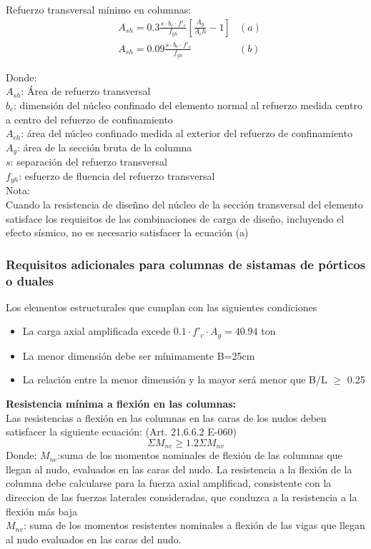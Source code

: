 \documentclass[12pt]{article}
\begin{document}
        Refuerzo transversal mínimo en columnas:
        \begin{align*}
            &A_{sh} = 0.3\frac{s \cdot b_c \cdot f'_c}{f_{yh}} \left[ \frac{A_g}{A_ch} -1  \right] &(a)\\
            &A_{sh} = 0.09 \frac{s \cdot b_c \cdot f'_c}{f_{yh}} &(b)
        \end{align*}

        Donde: \\
        $A_{sh}$: Área de refuerzo transversal\\
        $b_c$: dimensión del núcleo confinado del elemento normal al refuerzo medida centro a centro del refuerzo de confinamiento\\
        $A_{ch}$: área del núcleo confinado medida al exterior del refuerzo de confinamiento\\
        $A_g$: área de la sección bruta de la columna\\
        $s$: separación del refuerzo transversal\\
        $f_{yh}$: esfuerzo de fluencia del refuerzo transversal\\

        Nota:\\
        Cuando la resistencia de diseñno del núcleo de la sección transversal del elemento satisface
        los requisitos de las combinaciones de carga de diseño, incluyendo el efecto sísmico, no
        es necesario satisfacer la ecuación (a)\\

        \subsubsection{Requisitos adicionales para columnas de sistamas de pórticos o duales}
        Los elementos estructurales que cumplan con las siguientes condiciones 
        \begin{itemize}
            \item La carga axial amplificada excede $0.1 \cdot f'_c \cdot A_g = 40.94$ ton
            \item La menor dimensión debe ser mínimamente B=25cm
            \item La relación entre la menor dimensión y la mayor será menor que B/L $\geq$ 0.25      
        \end{itemize}

        \textbf{Resistencia mínima a flexión en las columnas:}\\
        Las resistencias a flexión en las columnas en las caras de los nudos deben satisfacer la siguiente ecuación: (Art. 21.6.6.2 E-060)\\
        \[\Sigma M_{nc} \geq 1.2 \Sigma M_{nv}\]
        Donde:
        $M_{nc}$:suma de los momentos nominales de flexión de las columnas que llegan al nudo, evaluados en las caras del nudo. La resistencia a la flexión de la columna debe calcularse para la fuerza axial amplificad, consistente con la direccion de las fuerzas laterales consideradas, que conduzca a la resistencia a la flexión más baja\\
        $M_{nv}$: suma de los momentos resistentes nominales a flexión de las vigas que llegan al nudo evaluados en las caras del nudo.

         



        
\end{document}
